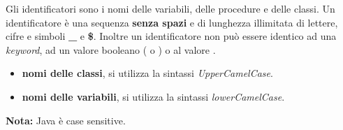 \documentclass[../main.tex]{subfiles}
\begin{document}
Gli identificatori sono i nomi delle variabili, delle procedure e delle classi. Un identificatore è una sequenza \textbf{senza spazi} e
di lunghezza illimitata di lettere, cifre e simboli \textbf{\_} e \textbf{\$}. Inoltre un identificatore non può essere identico
ad una \textit{keyword}, ad un valore booleano ( o ) o al valore .

\begin{itemize}
    \item \textbf{nomi delle classi}, si utilizza la sintassi \textit{UpperCamelCase}.
    \item\textbf{nomi delle variabili}, si utilizza la sintassi \textit{lowerCamelCase}.

\end{itemize}

\textbf{Nota:} Java è case sensitive.
\end{document}
